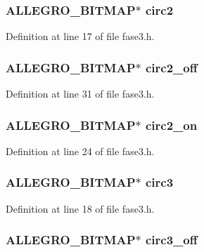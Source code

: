 \hypertarget{struct_level_tres_a1b8836cb8a00a286c87bfbafdacbd03d}{
\subsubsection[{circ2}]{\setlength{\rightskip}{0pt plus 5cm}A\-L\-L\-E\-G\-R\-O\-\_\-\-B\-I\-T\-M\-A\-P$\ast$ circ2}}\label{struct_level_tres_a1b8836cb8a00a286c87bfbafdacbd03d}


Definition at line 17 of file fase3.\-h.

\hypertarget{struct_level_tres_a384448f3d672f70b70b1bf454cb46e50}{
\subsubsection[{circ2\-\_\-off}]{\setlength{\rightskip}{0pt plus 5cm}A\-L\-L\-E\-G\-R\-O\-\_\-\-B\-I\-T\-M\-A\-P$\ast$ circ2\-\_\-off}}\label{struct_level_tres_a384448f3d672f70b70b1bf454cb46e50}


Definition at line 31 of file fase3.\-h.

\hypertarget{struct_level_tres_aa582b8f9acdbb85a2d1d54705e26fa15}{
\subsubsection[{circ2\-\_\-on}]{\setlength{\rightskip}{0pt plus 5cm}A\-L\-L\-E\-G\-R\-O\-\_\-\-B\-I\-T\-M\-A\-P$\ast$ circ2\-\_\-on}}\label{struct_level_tres_aa582b8f9acdbb85a2d1d54705e26fa15}


Definition at line 24 of file fase3.\-h.

\hypertarget{struct_level_tres_aaa21201ceebf455212233414bd6eedbc}{
\subsubsection[{circ3}]{\setlength{\rightskip}{0pt plus 5cm}A\-L\-L\-E\-G\-R\-O\-\_\-\-B\-I\-T\-M\-A\-P$\ast$ circ3}}\label{struct_level_tres_aaa21201ceebf455212233414bd6eedbc}


Definition at line 18 of file fase3.\-h.

\hypertarget{struct_level_tres_a91273d7098df87dd93c9f9a10b62ed08}{
\subsubsection[{circ3\-\_\-off}]{\setlength{\rightskip}{0pt plus 5cm}A\-L\-L\-E\-G\-R\-O\-\_\-\-B\-I\-T\-M\-A\-P$\ast$ circ3\-\_\-off}}\label{struct_level_tres_a91273d7098df87dd93c9f9a10b62ed08}


